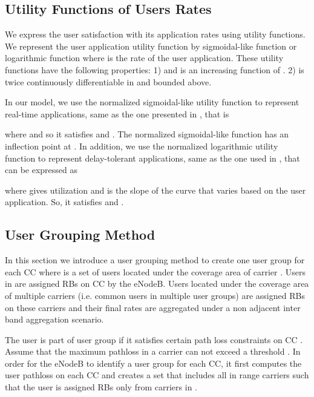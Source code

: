 \documentclass[conference]{IEEEtran}
\begin{document}
\subsection{Utility Functions of Users Rates}\label{sec:utility functions}
We express the user satisfaction with its application rates using utility functions. We represent the  user application utility function   by  sigmoidal-like function or logarithmic function where  is the rate of the  user application. These utility functions have the following properties: 1)  and  is an increasing function of . 2)  is twice continuously differentiable in  and bounded above.

In our model, we use the normalized sigmoidal-like utility function to represent real-time applications, same as the one presented in \cite{Ahmed_Utility1}, that is

where  and  so it satisfies  and . The normalized sigmoidal-like function has an inflection point at . In addition, we use the normalized logarithmic utility function to represent delay-tolerant applications, same as the one used in \cite{Ahmed_Utility1}, that can be expressed as

where  gives  utilization and  is the slope of the curve that varies based on the user application. So, it satisfies  and .
\vspace{-0.5em}
\subsection{User Grouping Method}\label{sec:UsersGrouping}
In this section we introduce a user grouping method to create one user group  for each CC  where  is a set of users located under the coverage area of carrier . Users in  are assigned RBs on CC  by the eNodeB. Users located under the coverage area of multiple carriers (i.e. common users in multiple user groups) are assigned RBs on these carriers and their final rates are aggregated under a non adjacent inter band aggregation scenario.

The  user is part of user group  if it satisfies certain path loss constraints on CC . Assume that the maximum pathloss in a carrier can not exceed a threshold . In order for the eNodeB to identify a user group for each CC, it first computes the  user pathloss on each CC and creates a set  that includes all in range carriers such that the  user is assigned RBs only from carriers in .
\end{document}
